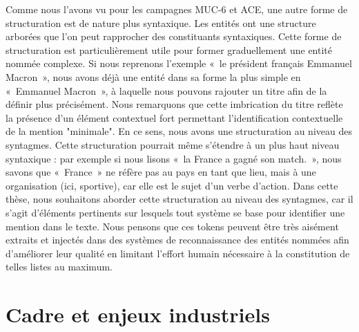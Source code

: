 \documentclass[12pt,a4paper,times,twoside,openright]{report}
\begin{document}
Comme nous l'avons vu pour les campagnes MUC-6 et ACE, une autre forme de structuration est de nature plus syntaxique. Les entités ont une structure arborées que l'on peut rapprocher des constituants syntaxiques. Cette forme de structuration est particulièrement utile pour former graduellement une entité nommée complexe. Si nous reprenons l'exemple «\ le président français Emmanuel Macron\ », nous avons déjà une entité dans sa forme la plus simple en «\ Emmanuel Macron\ », à laquelle nous pouvons rajouter un titre afin de la définir plus précisément. Nous remarquons que cette imbrication du titre reflète la présence d'un élément contextuel fort permettant l'identification contextuelle de la mention "minimale". En ce sens, nous avons une structuration au niveau des syntagmes. Cette structuration pourrait même s'étendre à un plus haut niveau syntaxique : par exemple si nous lisons «\ la France a gagné son match.\ », nous savons que «\ France\ » ne réfère pas au pays en tant que lieu, mais à une organisation (ici, sportive), car elle est le sujet d'un verbe d'action. Dans cette thèse, nous souhaitons aborder cette structuration au niveau des syntagmes, car il s'agit d'éléments pertinents sur lesquels tout système se base pour identifier une mention dans le texte. Nous pensons que ces tokens peuvent être très aisément extraits et injectés dans des systèmes de reconnaissance des entités nommées afin d'améliorer leur qualité en limitant l'effort humain nécessaire à la constitution de telles listes au maximum.



    \section{Cadre et enjeux industriels}
    \label{sec:industrial-frame-and-stakes}
\end{document}
